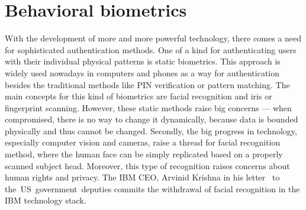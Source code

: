 \section{Behavioral biometrics}\label{sec:behavioral-biometrics}
With the development of more and more powerful technology, there comes a need for sophisticated authentication methods.
One of a kind for authenticating users with their individual physical patterns is static biometrics.
This approach is widely used nowadays in computers and phones as a way for authentication besides the traditional methods like PIN verification or pattern matching.
The main concepts for this kind of biometrics are facial recognition and iris or fingerprint scanning.
However, these static methods raise big concerns --- when compromised, there is no way to change it dynamically, because data is bounded physically and thus cannot be changed.
Secondly, the big progress in technology, especially computer vision and cameras, raise a thread for facial recognition method, where the human face can be simply replicated based on a properly scanned subject head.
Moreover, this type of recognition raises concerns about human rights and privacy.
The IBM CEO, Arvinid Krishna in his letter~\cite{ibm_2020} to \mbox{the US government deputies} commits the withdrawal of facial recognition in the IBM technology stack.

